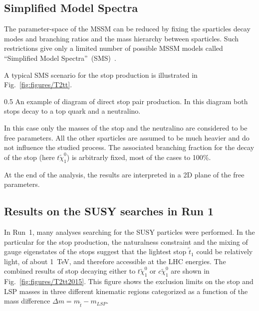 




\subsection{Simplified Model Spectra~\label{sec:SMS}}

The parameter-space of the MSSM can be reduced by fixing the sparticles decay modes and branching ratios and the mass hierarchy between sparticles. Such restrictions give only a limited number of possible MSSM models called ``Simplified Model Spectra''~(SMS)~\cite{Alves:2011wf, Alwall:2008ag, Chatrchyan:2013sza}.

A typical SMS scenario for the stop production is illustrated in Fig.~\ref{fig:figures/T2tt}.

                 {0.5}       %
                 { An example of diagram of direct stop pair production. In this diagram both stops decay to a top quark and a neutralino.} 

In this case only the masses of the stop and the neutralino are considered to be free parameters. All the other sparticles are assumed to be much heavier and do not influence the studied process. The associated branching fraction for the decay of the stop (here $t \tilde{\chi}_{1}^0$) is arbitrarly fixed, most of the cases to 100\%.

At the end of the analysis, the results are interpreted in a 2D plane of the free parameters.

\subsection{Results on the SUSY searches in Run 1}

In Run~1, many analyses searching for the SUSY particles were performed. In the particular for the stop production, the naturalness constraint and the mixing of gauge eigenstates of the stops suggest that the lightest stop $\tilde{t}_{1}$ could be relatively light, of about 1~TeV, and therefore accessible at the LHC energies. The combined results of stop decaying either to $t \tilde{\chi}_{1}^0$ or $c \tilde{\chi}_{1}^0$ are shown in Fig.~\ref{fig:figures/T2tt2015}. This figure shows the exclusion limits on the stop and LSP masses in three different kinematic regions categorized as a function of the mass difference  $\Delta m = m_{\tilde{t}} - m_{LSP}$.

